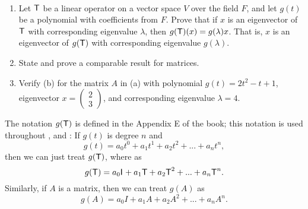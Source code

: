 \begin{exercise} \label{exercise 5.1.22} \ 

\begin{enumerate}
\item Let \(\textsf{T}\) be a linear operator on a vector space \(V\) over the field \(F\), and let \(g(t)\) be a polynomial with coefficients from \(F\).
Prove that if \(x\) is an eigenvector of \(\textsf{T}\) with corresponding eigenvalue \(\lambda\), then \(g(\textsf{T})(x) = g(\lambda)x\).
That is, \(x\) is an eigenvector of \(g(\textsf{T})\) with corresponding eigenvalue \(g(\lambda)\).
\item State and prove a comparable result for matrices.
\item Verify (b) for the matrix \(A\) in (a) with polynomial \(g(t) = 2t^2 - t + 1\), eigenvector \(x = \begin{pmatrix} 2 \\ 3 \end{pmatrix}\), and corresponding eigenvalue \(\lambda = 4\).
\end{enumerate}
\end{exercise}

\begin{note}
The notation \(g(\textsf{T})\) is defined in the Appendix E of the book;
this notation is used throughout ,  and :
If \(g(t)\) is degree \(n\) and
\[
    g(t) = a_0 t^0 + a_1 t^1 + a_2 t^2 + ... + a_n t^n,
\]
then we can just treat \(g(\textsf{T})\), where as
\[
    g(\textsf{T}) = a_0 \textsf{I}_{_{}} + a_1 \textsf{T} + a_2 \textsf{T}^2 + ... + a_n \textsf{T}^n.
\]
Similarly, if \(A\) is a matrix, then we can treat \(g(A)\) as
\[
    g(A) = a_0 I + a_1 A + a_2 A^2 + ... + a_n A^n.
\]
\end{note}

